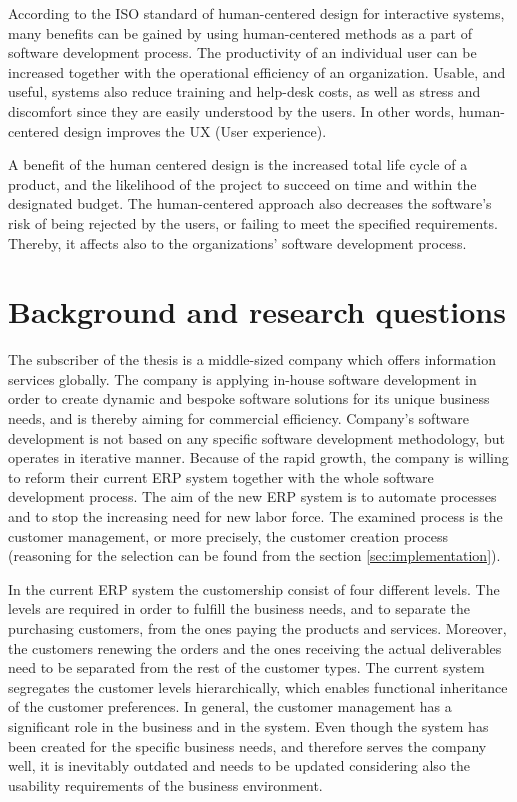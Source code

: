 \documentclass[12pt,a4paper,oneside,pdftex]{report}
\begin{document}
\indent According to the ISO standard of human-centered design for interactive systems, many benefits can be gained by using human-centered methods as a part of software development process. The productivity of an individual user can be increased together with the operational efficiency of an organization. Usable, and useful, systems also reduce training and help-desk costs, as well as stress and discomfort since they are easily understood by the users. In other words, human-centered design improves the UX (User experience). \citep{RefWorks:40}

A benefit of the human centered design is the increased total life cycle of a product, and the likelihood of the project to succeed on time and within the designated budget. The human-centered approach also decreases the software's risk of being rejected by the users, or failing to meet the specified requirements. \citep{RefWorks:40} Thereby, it affects also to the organizations' software development process.

\section{Background and research questions}
\label{sec:background}
The subscriber of the thesis is a middle-sized company which offers information services globally. The company is applying in-house software development in order to create dynamic and bespoke software solutions for its unique business needs, and is thereby aiming for commercial efficiency. Company's software development is not based on any specific software development methodology, but operates in iterative manner. Because of the rapid growth, the company is willing to reform their current ERP system together with the whole software development process. The aim of the new ERP system is to automate processes and to stop the increasing need for new labor force. The examined process is the customer management, or more precisely, the customer creation process  (reasoning for the selection can be found from the section \ref{sec:implementation}). 

In the current ERP system the customership consist of four different levels. The levels are required in order to fulfill the business needs, and to separate the purchasing customers, from the ones paying the products and services. Moreover, the customers renewing the orders and the ones receiving the actual deliverables need to be separated from the rest of the customer types. The current system segregates the customer levels hierarchically, which enables functional inheritance of the customer preferences. In general, the customer management has a significant role in the business and in the system. Even though the system has been created for the specific business needs, and therefore serves the company well, it is inevitably outdated and needs to be updated considering also the usability requirements of the business environment.
\end{document}
